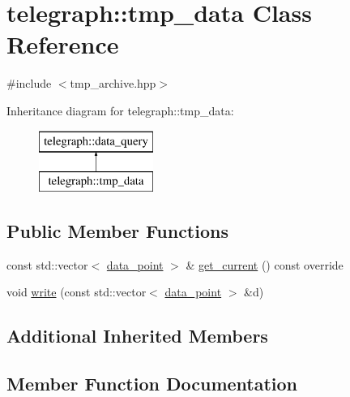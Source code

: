 \hypertarget{classtelegraph_1_1tmp__data}{}\section{telegraph\+:\+:tmp\+\_\+data Class Reference}
\label{classtelegraph_1_1tmp__data}


{\ttfamily \#include $<$tmp\+\_\+archive.\+hpp$>$}

Inheritance diagram for telegraph\+:\+:tmp\+\_\+data\+:\begin{figure}[H]
\begin{center}
\leavevmode
\includegraphics[height=2.000000cm]{classtelegraph_1_1tmp__data}
\end{center}
\end{figure}
\subsection*{Public Member Functions}
\begin{DoxyCompactItemize}
\item 
const std\+::vector$<$ \hyperlink{classtelegraph_1_1data__point}{data\+\_\+point} $>$ \& \hyperlink{classtelegraph_1_1tmp__data_a0cc69096544afeaffaae5f25587dc62f}{get\+\_\+current} () const override
\item 
void \hyperlink{classtelegraph_1_1tmp__data_a32f7e20afb889b3f9b179cfefed31f9e}{write} (const std\+::vector$<$ \hyperlink{classtelegraph_1_1data__point}{data\+\_\+point} $>$ \&d)
\end{DoxyCompactItemize}
\subsection*{Additional Inherited Members}


\subsection{Member Function Documentation}
\mbox{\label{classtelegraph_1_1tmp__data_a0cc69096544afeaffaae5f25587dc62f}} 
